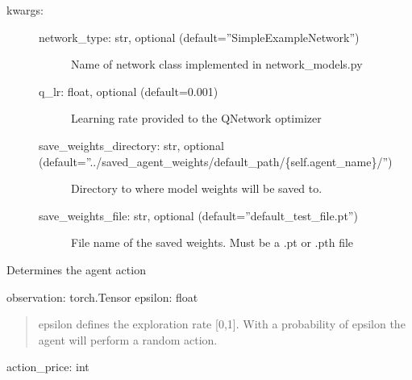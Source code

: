 \documentclass[letterpaper,10pt,english]{sphinxmanual}
\begin{document}
\begin{fulllineitems}
\begin{fulllineitems}
\begin{description}
\item[{kwargs:}] \leavevmode\begin{description}
\item[{network\_type: str, optional (default=”SimpleExampleNetwork”)}] \leavevmode
\sphinxAtStartPar
Name of network class implemented in network\_models.py

\item[{q\_lr: float, optional (default=0.001)}] \leavevmode
\sphinxAtStartPar
Learning rate provided to the Q\sphinxhyphen{}Network optimizer

\item[{save\_weights\_directory: str, optional (default=”../saved\_agent\_weights/default\_path/\{self.agent\_name\}/”)}] \leavevmode
\sphinxAtStartPar
Directory to where model weights will be saved to.

\item[{save\_weights\_file: str, optional (default=”default\_test\_file.pt”)}] \leavevmode
\sphinxAtStartPar
File name of the saved weights. Must be a .pt or .pth file

\end{description}

\end{description}

\end{fulllineitems}


\begin{fulllineitems}
\label{\detokenize{MultiAgentMarketRL:agents.DQNAgent.get_action}}
\sphinxAtStartPar
Determines the agent action

\sphinxAtStartPar
observation: torch.Tensor
epsilon: float
\begin{quote}

\sphinxAtStartPar
epsilon defines the exploration rate {[}0,1{]}. With a probability of epsilon the agent will perform a random
action.
\end{quote}

\sphinxAtStartPar
action\_price: int

\end{fulllineitems}



\end{fulllineitems}
\end{document}
